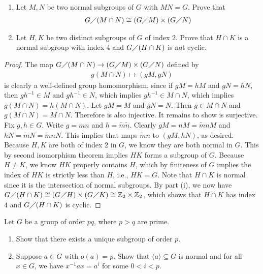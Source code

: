 \documentclass{report}
\begin{document}
\begin{question}{}{}
\begin{enumerate}[label=(\roman*)]
  \item Let $M,N$ be two normal subgroups of  $G$ with  $MN=G$. Prove that 
\begin{align*}
    G\diagup (M\cap N) \cong  (G\diagup M) \times (G\diagup N)
\end{align*} 
\item Let $H,K$ be two distinct subgroups of  $G$ of index  $2$. Prove that  $H\cap K$ is a normal subgroup with index $4$ and  $G \diagup (H\cap K)$ is not cyclic.  
\end{enumerate}
\end{question}
\begin{proof}
The map $G\diagup (M\cap N) \rightarrow (G \diagup M)\times (G\diagup N)$ defined by 
\begin{align}
\label{EQmg}
g(M\cap N) \mapsto (gM,gN)
\end{align}
is clearly a well-defined group homomorphism, since if $gM=hM$ and  $gN=hN$, then  $gh^{-1}\in M$ and $gh^{-1} \in N$, which implies $gh^{-1}\in M \cap N$, which implies $g(M\cap N)=h(M \cap N)$. Let $gM=M$ and  $gN=N$. Then  $g \in M \cap N$ and $g(M \cap N)=M \cap N$. Therefore  is also injective. It remains to show  is surjective. Fix $g,h \in G$. Write $g=mn$ and  $h=\tilde{m}\tilde{n}$. Clearly $gM=nM=\tilde{m}nM$ and  $hN=\tilde{m}N=\tilde{m}nN $. This implies that   maps $\tilde{m}n$ to $(gM,hN)$, as desired.\\

Because $H,K$ are both of index  $2$ in $G$, we know they are both normal in $G$. This by second isomorphism theorem implies  $HK$ forms a subgroup of  $G$. Because $H\neq K$, we know $HK$ properly contains $H$, which by finiteness of $G$ implies  the index of $HK$ is strictly less than  $H$, i.e., $HK=G$. Note that $H \cap K$ is normal since it is the intersection of normal subgroups. By part (i), we now have $G \diagup (H\cap K)\cong  (G \diagup H)\times (G\diagup K)\cong  \mathbb{Z}_2\times\mathbb{Z}_2$, which shows that $H \cap K$ has index $4$ and  $G \diagup (H\cap K)$ is cyclic.     
\end{proof}
\begin{question}{}{}
Let $G$ be a group of order  $pq$, where  $p>q$ are prime. 
\begin{enumerate}[label=(\roman*)]
  \item Show that there exists a unique subgroup of order $p$.  
  \item Suppose $a \in G$ with $o(a)=p$. Show that $\langle a\rangle \subseteq G$ is normal and for all $x \in G$, we have $x^{-1}ax =a^i$ for some $0<i<p$. 
\end{enumerate}
\end{question}
\end{document}
